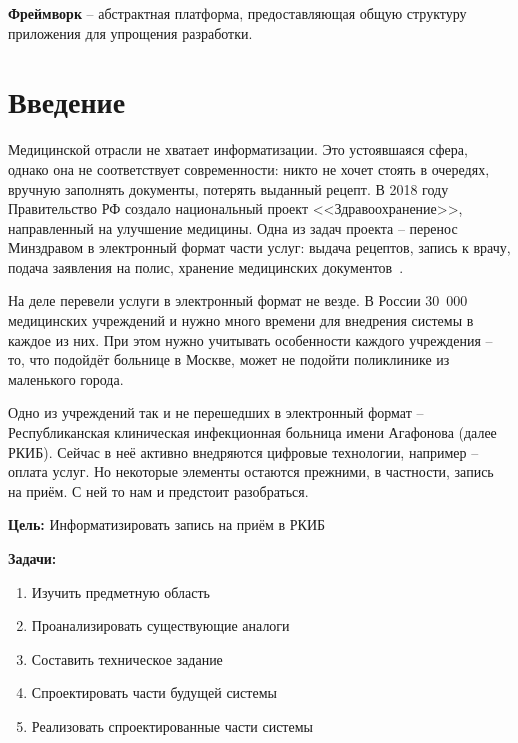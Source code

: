 \documentclass[a4paper,article]{article}
\begin{document}
\begin{sloppypar}
    \textbf{Фреймворк} -- абстрактная платформа, предоставляющая общую структуру приложения для упрощения разработки.

    \newpage

    \section*{Введение}

        Медицинской отрасли не хватает информатизации. Это устоявшаяся сфера, однако она не соответствует современности: никто не хочет стоять в очередях, вручную заполнять документы, потерять выданный рецепт. В 2018 году Правительство РФ создало национальный проект <<Здравоохранение>>, направленный на улучшение медицины. Одна из задач проекта -- перенос Минздравом в электронный формат части услуг: выдача рецептов, запись к врачу, подача заявления на полис, хранение медицинских документов~\cite{natsproektzdravoohranenie}.

        На деле перевели услуги в электронный формат не везде. В России 30~000 медицинских учреждений и нужно много времени для внедрения системы в каждое из них. При этом нужно учитывать особенности каждого учреждения -- то, что подойдёт больнице в Москве, может не подойти поликлинике из маленького города.

        Одно из учреждений так и не перешедших в электронный формат -- Республиканская клиническая инфекционная больница имени Агафонова (далее РКИБ). Сейчас в неё активно внедряются цифровые технологии, например -- оплата услуг. Но некоторые элементы остаются прежними, в частности, запись на приём. С ней то нам и предстоит разобраться.

        \textbf{Цель:} Информатизировать запись на приём в РКИБ

        \textbf{Задачи:}

        \begin{enumerate}[nolistsep]
            \item Изучить предметную область
            \item Проанализировать существующие аналоги
            \item Составить техническое задание
            \item Спроектировать части будущей системы
            \item Реализовать спроектированные части системы
        \end{enumerate}


\end{sloppypar}
\end{document}
